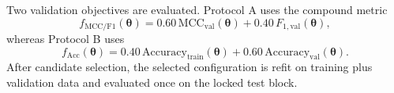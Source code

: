 Two validation objectives are evaluated. Protocol A uses the compound metric
\begin{equation}
f_{\mathrm{MCC/F1}}(\boldsymbol{\theta})=0.60\,\mathrm{MCC}_{\mathrm{val}}(\boldsymbol{\theta})+0.40\,F_{1,\mathrm{val}}(\boldsymbol{\theta}),
\end{equation}
whereas Protocol B uses
\begin{equation}
f_{\mathrm{Acc}}(\boldsymbol{\theta})=0.40\,\mathrm{Accuracy}_{\mathrm{train}}(\boldsymbol{\theta})+0.60\,\mathrm{Accuracy}_{\mathrm{val}}(\boldsymbol{\theta}).
\end{equation}
After candidate selection, the selected configuration is refit on training plus validation data and evaluated once on the locked test block.
